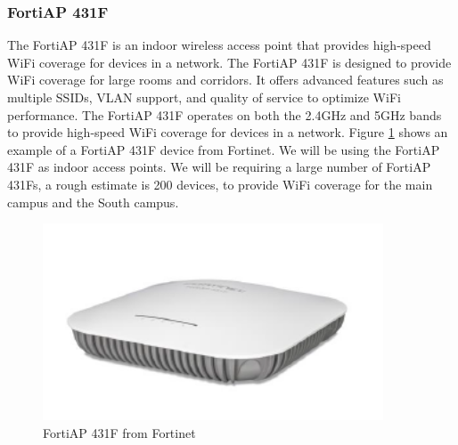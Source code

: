 \documentclass[12pt]{report}
\begin{document}
\subsubsection{FortiAP 431F}
The FortiAP 431F is an indoor wireless access point that provides high-speed WiFi coverage for devices in a network. The FortiAP 431F is designed to provide WiFi coverage for large rooms and corridors. It offers advanced features such as multiple SSIDs, VLAN support, and quality of service to optimize WiFi performance. The FortiAP 431F operates on both the 2.4GHz and 5GHz bands to provide high-speed WiFi coverage for devices in a network.\cite{FAPList} Figure \ref{fig:431F} shows an example of a FortiAP 431F device from Fortinet. We will be using the FortiAP 431F as indoor access points. We will be requiring a large number of FortiAP 431Fs, a rough estimate is 200 devices, to provide WiFi coverage for the main campus and the South campus. 
\begin{figure}[h]
    \centering
    \includegraphics[width=0.9\textwidth]{images/431F.png}
    \caption{FortiAP 431F from Fortinet \cite{FAP431FIMG}}
    \label{fig:431F}
\end{figure}
\end{document}
